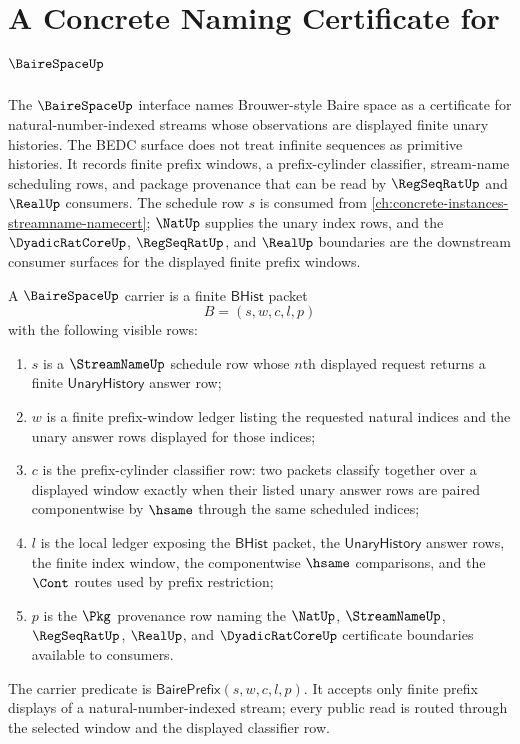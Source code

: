 \chapter{A Concrete Naming Certificate for $\BaireSpaceUp$}
\label{ch:concrete-instances-bairespace-namecert}

The $\BaireSpaceUp$ interface names Brouwer-style Baire space as a certificate
for natural-number-indexed streams whose observations are displayed finite
unary histories. The BEDC surface does not treat infinite sequences as
primitive histories. It records finite prefix windows, a prefix-cylinder
classifier, stream-name scheduling rows, and package provenance that can be
read by $\RegSeqRatUp$ and $\RealUp$ consumers.
The schedule row $s$ is consumed from
\autoref{ch:concrete-instances-streamname-namecert}; $\NatUp$ supplies the
unary index rows, and the $\DyadicRatCoreUp$, $\RegSeqRatUp$, and $\RealUp$
boundaries are the downstream consumer surfaces for the displayed finite
prefix windows.

\begin{definition}
\label{def:baire-space-stream-carrier}
A $\BaireSpaceUp$ carrier is a finite $\mathsf{BHist}$ packet
$$
B=(s,w,c,l,p)
$$
with the following visible rows:
\begin{enumerate}
\item $s$ is a $\StreamNameUp$ schedule row whose $n$th displayed request
returns a finite $\mathsf{UnaryHistory}$ answer row;
\item $w$ is a finite prefix-window ledger listing the requested natural
indices and the unary answer rows displayed for those indices;
\item $c$ is the prefix-cylinder classifier row: two packets classify together
over a displayed window exactly when their listed unary answer rows are paired
componentwise by $\hsame$ through the same scheduled indices;
\item $l$ is the local ledger exposing the $\mathsf{BHist}$ packet, the
$\mathsf{UnaryHistory}$ answer rows, the finite index window, the
componentwise $\hsame$ comparisons, and the $\Cont$ routes used by prefix
restriction;
\item $p$ is the $\Pkg$ provenance row naming the $\NatUp$, $\StreamNameUp$,
$\RegSeqRatUp$, $\RealUp$, and $\DyadicRatCoreUp$ certificate boundaries
available to consumers.
\end{enumerate}
The carrier predicate is $\mathsf{BairePrefix}(s,w,c,l,p)$. It accepts only
finite prefix displays of a natural-number-indexed stream; every public read
is routed through the selected window and the displayed classifier row.
\end{definition}

